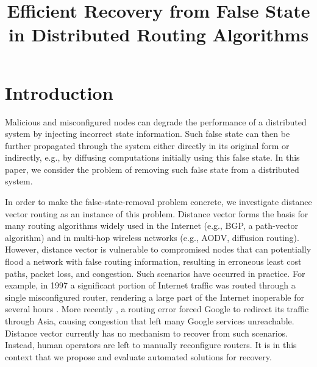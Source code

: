 \documentclass[10pt,conference]{IEEEtran}
\newcommand{\doctitle}{Efficient Recovery from False State in Distributed Routing Algorithms}
\begin{document}
\title{\doctitle}


\author{
} 

\maketitle



\section{Introduction}
\label{sec:intro}


Malicious and misconfigured nodes can degrade the performance of a distributed system by injecting incorrect state information. Such false state can then be further propagated 
through the system either directly in its original form or indirectly, e.g., by diffusing computations initially using this false state.  In this paper, we consider 
the problem of removing such false state from a distributed system.

In order to make the false-state-removal problem concrete, we investigate distance vector routing as an instance of this problem. Distance vector forms the basis for many routing 
algorithms widely used in the Internet (e.g., BGP, a path-vector algorithm) and in multi-hop wireless networks (e.g., AODV, diffusion routing). However, distance vector is vulnerable 
to compromised nodes that can potentially flood a network with false routing information, resulting in erroneous least cost paths, packet loss, and congestion. Such scenarios have occurred
in practice. For example, in 1997 a significant portion of Internet traffic was routed through a single misconfigured router, rendering a large part of the Internet inoperable for several
hours \cite{Neumann97}. More recently \cite{Google}, a routing error forced Google to redirect its traffic through Asia, causing congestion that left many Google services unreachable. 
Distance vector currently has no mechanism to recover from such scenarios. Instead, human operators are left to manually reconfigure routers. It is in this context that we propose and
evaluate automated solutions for recovery.
\end{document}
